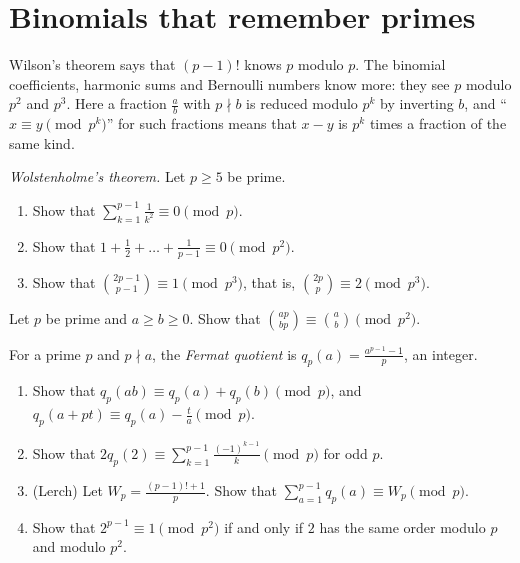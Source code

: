 \section{Binomials that remember primes}

Wilson's theorem says that $(p-1)!$ knows $p$ modulo $p$. The binomial coefficients, harmonic sums and Bernoulli numbers
know more: they see $p$ modulo $p^2$ and $p^3$. Here a fraction $\frac ab$ with $p\nmid b$ is reduced modulo $p^k$ by
inverting $b$, and ``$x\equiv y\pmod{p^k}$'' for such fractions means that $x-y$ is $p^k$ times a fraction of the same kind.

\begin{exercise}[$\star\star$]\label{pb:wolsten}
\emph{Wolstenholme's theorem.} Let $p\ge5$ be prime.
\begin{enumerate}[label=(\alph*)]
\item Show that $\sum_{k=1}^{p-1}\frac1{k^2}\equiv0\pmod p$.
\item Show that $1+\frac12+\dots+\frac1{p-1}\equiv0\pmod{p^2}$.
\item Show that $\binom{2p-1}{p-1}\equiv1\pmod{p^3}$, that is, $\binom{2p}p\equiv2\pmod{p^3}$.
\end{enumerate}
\end{exercise}

\begin{exercise}[$\star\star$]\label{pb:jacobsthal}
Let $p$ be prime and $a\ge b\ge0$. Show that $\binom{ap}{bp}\equiv\binom ab\pmod{p^2}$.
\end{exercise}

\begin{exercise}[$\star\star$]\label{pb:fermatquot}
For a prime $p$ and $p\nmid a$, the \emph{Fermat quotient} is $q_p(a)=\frac{a^{p-1}-1}p$, an integer.
\begin{enumerate}[label=(\alph*)]
\item Show that $q_p(ab)\equiv q_p(a)+q_p(b)\pmod p$, and $q_p(a+pt)\equiv q_p(a)-\frac ta\pmod p$.
\item Show that $2q_p(2)\equiv\sum_{k=1}^{p-1}\frac{(-1)^{k-1}}k\pmod p$ for odd $p$.
\item (Lerch) Let $W_p=\frac{(p-1)!+1}p$. Show that $\sum_{a=1}^{p-1}q_p(a)\equiv W_p\pmod p$.
\item Show that $2^{p-1}\equiv1\pmod{p^2}$ if and only if $2$ has the same order modulo $p$ and modulo $p^2$.
\end{enumerate}
\end{exercise}

